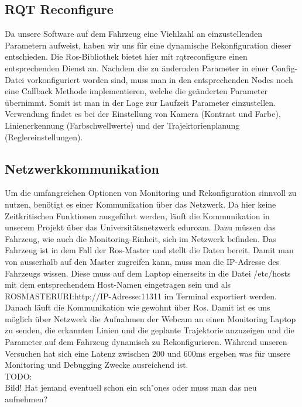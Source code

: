 \subsection{RQT Reconfigure}
Da unsere Software auf dem Fahrzeug eine Viehlzahl an einzustellenden Parametern aufweist, haben wir uns f\"ur eine dynamische Rekonfiguration dieser entschieden. Die Ros-Bibliothek bietet hier mit rqt\textunderscore reconfigure einen entsprechenden Dienst an. Nachdem die zu \"andernden Parameter in einer Config-Datei vorkonfiguriert worden sind, muss man in den entsprechenden Nodes noch eine Callback Methode implementieren, welche die ge\"anderten Parameter \"ubernimmt. Somit ist man in der Lage zur Laufzeit Parameter einzustellen. Verwendung findet es bei der Einstellung von Kamera (Kontrast und Farbe), Linienerkennung (Farbschwellwerte) und der Trajektorienplanung (Reglereinstellungen).

\subsection{Netzwerkkommunikation}
Um die umfangreichen Optionen von Monitoring und Rekonfiguration sinnvoll zu nutzen, ben\"otigt es einer Kommunikation \"uber das Netzwerk. Da hier keine Zeitkritischen Funktionen ausgef\"uhrt werden, l\"auft die Kommunikation in unserem Projekt \"uber das Universit\"atsnetzwerk eduroam. Dazu m\"ussen das Fahrzeug, wie auch die Monitoring-Einheit, sich im Netzwerk befinden. Das Fahrzeug ist in dem Fall der Ros-Master und stellt die Daten bereit. Damit man von ausserhalb auf den Master zugreifen kann, muss man die IP-Adresse des Fahrzeugs wissen. Diese muss auf dem Laptop einerseits in die Datei /etc/hosts mit dem entsprechendem Host-Namen eingetragen sein und als ROS\textunderscore MASTER\textunderscore URI:http://IP-Adresse:11311 im Terminal exportiert werden. Danach l\"auft die Kommunikation wie gewohnt \"uber Ros. Damit ist es uns m\"oglich \"uber Netzwerk die Aufnahmen der Webcam an einen Monitoring Laptop zu senden, die erkannten Linien und die geplante Trajektorie anzuzeigen und die Parameter auf dem Fahrzeug dynamisch zu Rekonfigurieren. W\"ahrend unseren Versuchen hat sich eine Latenz zwischen 200 und 600ms ergeben was f\"ur unsere Monitoring und Debugging Zwecke ausreichend ist. \\

TODO:\\
Bild! Hat jemand eventuell schon ein sch"ones oder muss man das neu aufnehmen?